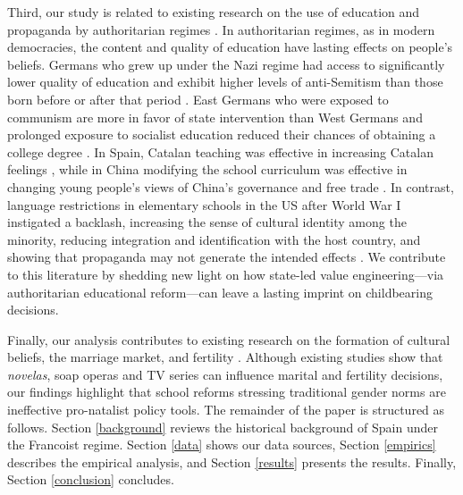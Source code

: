 \documentclass[a4paper,oneside,final,onecolumn,12pt,english]{article}
\begin{document}
Third, our study is related to existing research on the use of education and propaganda by authoritarian regimes \citep{waldinger2010quality, waldinger2012peer, adena2015, voigtlander2015, fuchs2016long, cantoni2017curriculum, homola, gonzalez2024empowerment, merilainencommunism, grebolnavarro}. In authoritarian regimes, as in modern democracies, the content and quality of education have lasting effects on people's beliefs.  Germans who grew up under the Nazi regime had access to significantly lower quality of education \citep{waldinger2010quality, waldinger2012peer} and exhibit higher levels of anti-Semitism than those born before or after that period \citep{voigtlander2015}. East Germans who were exposed to communism are more in favor of state intervention than West Germans \citep{alesina2007good} and prolonged exposure to socialist education reduced their chances of obtaining a college degree \citep{fuchs2016long}. In Spain, Catalan teaching was effective in increasing Catalan feelings \citep{clots_masella2013}, while in China modifying the school curriculum was effective in changing young people's views of China's governance and free trade \citep{cantoni2017curriculum}. In contrast, language restrictions in elementary schools in the US after World War I instigated a backlash, increasing the sense of cultural identity among the minority, reducing integration and identification with the host country, and showing that propaganda may not generate the intended effects \citep{fouka2020}. We contribute to this literature  by shedding new light on how state-led value engineering—via authoritarian educational reform—can leave a lasting imprint on childbearing decisions.


Finally, our analysis contributes to existing research on the formation of cultural beliefs, the marriage market, and fertility \citep{chong_laferrara2009, laferrara_etal2012}. Although existing studies show that \textit{novelas}, soap operas and TV series can influence marital and fertility decisions, our findings highlight that school reforms stressing traditional gender norms are ineffective pro-natalist policy tools. The remainder of the paper is structured as follows. Section \ref{background} reviews the historical background of Spain under the Francoist regime. Section \ref{data} shows our data sources, Section \ref{empirics} describes the empirical analysis, and Section \ref{results} presents the results. Finally, Section \ref{conclusion} concludes.
 
\end{document}
